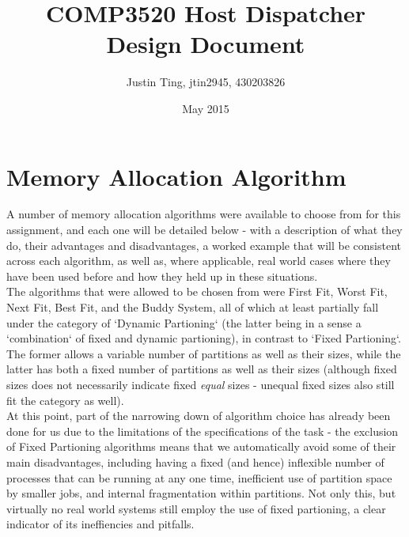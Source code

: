 \documentclass[11pt]{article}
\title {COMP3520 Host Dispatcher Design Document}
\author {Justin Ting, jtin2945, 430203826}
\date {May 2015}
\begin{document}
\maketitle

\section{Memory Allocation Algorithm}

\iffalse
(Provides a thorough description of ALL prescribed memory allocation schemes - 6 marks)
(Provides an informed discussion of the advantages and disadvantages of these schemes)
For each: pros, cons, examples
a. Describe and discuss what memory allocation algorithms you could have used
and justify your final design choice
\fi

A number of memory allocation algorithms were available to choose from for this assignment, and each one will be detailed below - with a description of what they do, their advantages and disadvantages, a worked example that will be consistent across each algorithm, as well as, where applicable, real world cases where they have been used before and how they held up in these situations.\\

The algorithms that were allowed to be chosen from were First Fit, Worst Fit, Next Fit, Best Fit, and the Buddy System, all of which at least partially fall under the category of `Dynamic Partioning` (the latter being in a sense a `combination` of fixed and dynamic partioning), in contrast to `Fixed Partioning`. The former allows a variable number of partitions as well as their sizes, while the latter has both a fixed number of partitions as well as their sizes (although fixed sizes does not necessarily indicate fixed \textit{equal} sizes - unequal fixed sizes also still fit the category as well).\\

At this point, part of the narrowing down of algorithm choice has already been done for us due to the limitations of the specifications of the task - the exclusion of Fixed Partioning algorithms means that we automatically avoid some of their main disadvantages, including having a fixed (and hence) inflexible number of processes that can be running at any one time, inefficient use of partition space by smaller jobs, and internal fragmentation within partitions. Not only this, but virtually no real world systems still employ the use of fixed partioning, a clear indicator of its ineffiencies and pitfalls.\\
\iffalse reference the textbook here, page 314\fi
\end{document}
